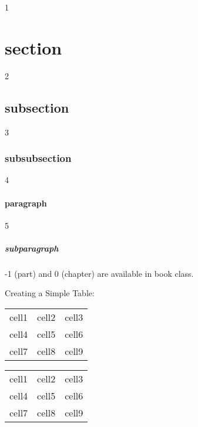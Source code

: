 \documentclass[12pt, letterpaper, twoside]{article}
\begin{document}
	1	\section{section}
	2	\subsection{subsection}
	3	\subsubsection{subsubsection}
	4	\paragraph{paragraph}
	5	\subparagraph{subparagraph}
	
	-1 (part) and 0 (chapter) are available in book class. 
	
	Creating a Simple Table:
	\begin{center}
		\begin{tabular}{ c c c }
			cell1 & cell2 & cell3 \\ 
			cell4 & cell5 & cell6 \\  
			cell7 & cell8 & cell9    
		\end{tabular}
	\end{center}

\begin{center}
	\begin{tabular}{ |c|c|c| } 
		\hline
		cell1 & cell2 & cell3 \\ 
		cell4 & cell5 & cell6 \\ 
		cell7 & cell8 & cell9 \\ 
		\hline
	\end{tabular}
\end{center}
\end{document}
